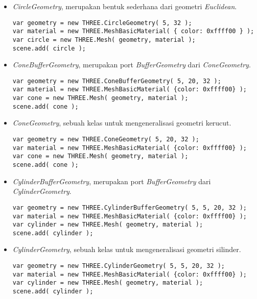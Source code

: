 \begin{itemize}
\begin{itemize}
	\item {\it CircleGeometry}, merupakan bentuk sederhana dari geometri {\it Euclidean}.
	
\begin{lstlisting}
var geometry = new THREE.CircleGeometry( 5, 32 );
var material = new THREE.MeshBasicMaterial( { color: 0xffff00 } );
var circle = new THREE.Mesh( geometry, material );
scene.add( circle );
\end{lstlisting}
	
	\item {\it ConeBufferGeometry}, merupakan port {\it BufferGeometry} dari {\it ConeGeometry}.
	
\begin{lstlisting}
var geometry = new THREE.ConeBufferGeometry( 5, 20, 32 );
var material = new THREE.MeshBasicMaterial( {color: 0xffff00} );
var cone = new THREE.Mesh( geometry, material );
scene.add( cone );
\end{lstlisting}
	
	\item {\it ConeGeometry}, sebuah kelas untuk mengeneralisasi geometri kerucut.
	
\begin{lstlisting}
var geometry = new THREE.ConeGeometry( 5, 20, 32 );
var material = new THREE.MeshBasicMaterial( {color: 0xffff00} );
var cone = new THREE.Mesh( geometry, material );
scene.add( cone );
\end{lstlisting}

	\item {\it CylinderBufferGeometry}, merupakan port {\it BufferGeometry} dari {\it CylinderGeometry}.
	
\begin{lstlisting}
var geometry = new THREE.CylinderBufferGeometry( 5, 5, 20, 32 );
var material = new THREE.MeshBasicMaterial( {color: 0xffff00} );
var cylinder = new THREE.Mesh( geometry, material );
scene.add( cylinder );
\end{lstlisting}

	\item {\it CylinderGeometry}, sebuah kelas untuk mengeneralisasi geometri silinder.
	
\begin{lstlisting}
var geometry = new THREE.CylinderGeometry( 5, 5, 20, 32 );
var material = new THREE.MeshBasicMaterial( {color: 0xffff00} );
var cylinder = new THREE.Mesh( geometry, material );
scene.add( cylinder );
\end{lstlisting}


\end{itemize}
\end{itemize}
